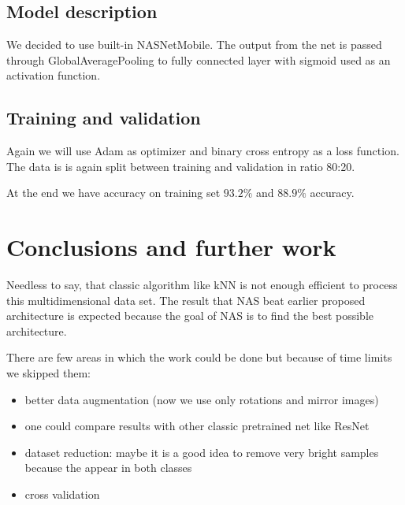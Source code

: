 \documentclass[12pt, a4paper]{article}
\begin{document}
\subsection*{Model description}
\noindent
We decided to use built-in NASNetMobile. The output from the net is passed through GlobalAveragePooling to fully connected layer with sigmoid used as an activation function.

\subsection*{Training and validation}
\noindent
Again we will use Adam as optimizer and binary cross entropy as a loss function. The data is is again split between training and validation in ratio 80:20.

\noindent
At the end we have accuracy on training set $ 93.2\% $ and $ 88.9 \% $ accuracy.

\section{Conclusions and further work}

\noindent
Needless to say, that classic algorithm like kNN is not enough efficient to process this multidimensional data set. The result that NAS beat earlier proposed architecture is expected because the goal of NAS is to find the best possible architecture.

\noindent
There are few areas in which the work could be done but because of time limits we skipped them:
\begin{itemize}
	\item better data augmentation (now we use only rotations and mirror images)
	\item one could compare results with other classic pretrained net like ResNet
	\item dataset reduction: maybe it is a good idea to remove very bright samples because the appear in both classes
	\item cross validation
\end{itemize}
\end{document}
